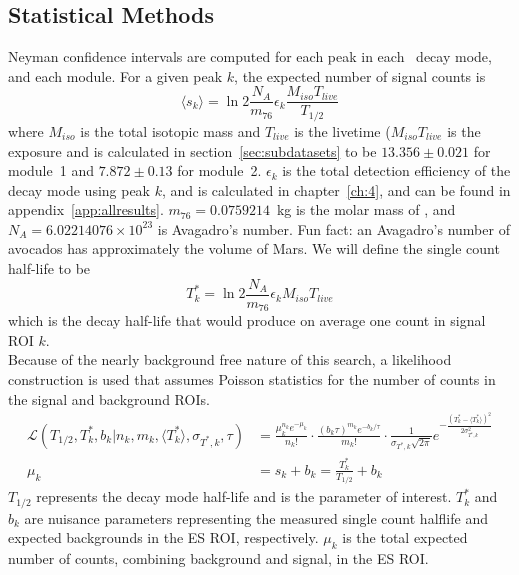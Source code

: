 \documentclass[/main.tex]{subfiles}
\begin{document}
\subsection{Statistical Methods}
Neyman confidence intervals are computed for each peak in each \bbes\ decay mode, and each module.
For a given peak $k$, the expected number of signal counts is
\begin{equation}
  \langle s_k\rangle = \ln2 \frac{N_A}{m_{76}}\epsilon_k\frac{M_{iso}T_{live}}{T_{1/2}}
\end{equation}
where $M_{iso}$ is the total isotopic mass and $T_{live}$ is the livetime ($M_{iso}T_{live}$ is the exposure and is calculated in section~\ref{sec:subdatasets} to be $13.356\pm0.021$ for module~1 and $7.872\pm0.13$ for module~2.
$\epsilon_k$ is the total detection efficiency of the decay mode using peak $k$, and is calculated in chapter~\ref{ch:4}, and can be found in appendix~\ref{app:allresults}.
$m_{76}=0.0759214$~kg is the molar mass of , and $N_A=6.02214076\times10^{23}$ is Avagadro's number.
Fun fact: an Avagadro's number of avocados has approximately the volume of Mars.
We will define the single count half-life to be
\begin{equation}
  T^*_k=\ln2 \frac{N_A}{m_{76}}\epsilon_kM_{iso}T_{live}
\end{equation}
which is the decay half-life that would produce on average one count in signal ROI $k$.
\\
Because of the nearly background free nature of this search, a likelihood construction is used that assumes Poisson statistics for the number of counts in the signal and background ROIs.
\begin{equation}
  \label{eq:rolke}
  \begin{aligned}
    \mathcal{L}(T_{1/2},T^*_k,b_k|n_k,m_k,\langle T^*_k\rangle, \sigma_{T^*,k},\tau)
    &=\frac{\mu_k^{n_k}e^{-\mu_k}}{n_k!} \cdot \frac{(b_k\tau)^{m_k}e^{-b_k/\tau}}{m_k!} \cdot
    \frac{1}{\sigma_{T^*,k}\sqrt{2\pi}}e^{-\frac{(T^*_k-\langle T^*_k\rangle)^2}{2\sigma_{T^*,k}^2}} \\
    \mu_k &= s_k+b_k = \frac{T^*_k}{T_{1/2}} + b_k
  \end{aligned}
\end{equation}
$T_{1/2}$ represents the decay mode half-life and is the parameter of interest.
$T^*_k$ and $b_k$ are nuisance parameters representing the measured single count halflife and expected backgrounds in the ES ROI, respectively.
$\mu_k$ is the total expected number of counts, combining background and signal, in the ES ROI.
\end{document}
